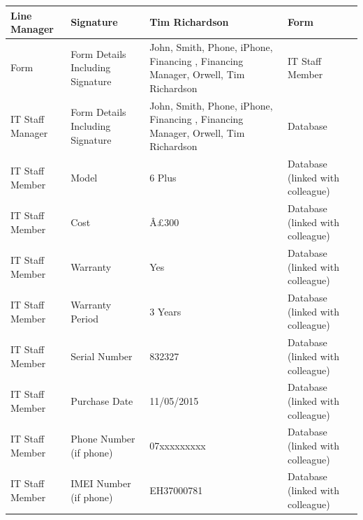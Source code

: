 \begin{longtable}{|p{3cm}|p{3cm}|p{3cm}|p{3cm}|}
Line Manager                          & Signature                          & Tim Richardson                                     & Form                                      \\ \hline
Form                                  & Form Details Including Signature   & John, Smith, Phone, iPhone, Financing , Financing Manager, Orwell, Tim Richardson & IT Staff Member                           \\ \hline
IT Staff Manager                      & Form Details Including Signature   & John, Smith, Phone, iPhone, Financing , Financing Manager, Orwell, Tim Richardson & Database                                  \\ \hline
IT Staff Member                             & Model                              & 6 Plus                                             & Database (linked with colleague)                                      \\ \hline
IT Staff Member                       & Cost                              & Â£300                                               & Database (linked with colleague)          \\ \hline
IT Staff Member                       & Warranty                           & Yes                                        & Database (linked with colleague)          \\ \hline
IT Staff Member                       & Warranty Period                           & 3 Years                                            & Database (linked with colleague)          \\ \hline
IT Staff Member                       & Serial Number                      & 832327                                             & Database (linked with colleague)          \\ \hline
IT Staff Member                       & Purchase Date                      & 11/05/2015                                         & Database (linked with colleague)          \\ \hline
IT Staff Member                       & Phone Number (if phone)            & 07xxxxxxxxx                                        & Database (linked with colleague)          \\ \hline
IT Staff Member		&IMEI Number (if phone)            & EH37000781                                      & Database (linked with colleague)          \\ \hline	
\end{longtable}
\

